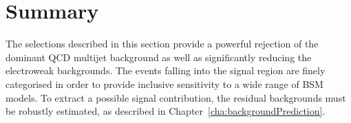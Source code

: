 \section{Summary}

The selections described in this section provide a powerful rejection of the dominant QCD multijet background as well as significantly reducing the electroweak backgrounds. 
The events falling into the signal region are finely categorised in order to provide inclusive sensitivity to a wide range of BSM models. 
To extract a possible signal contribution, the residual backgrounds must be robustly estimated, as described in Chapter~\ref{cha:backgroundPrediction}.

